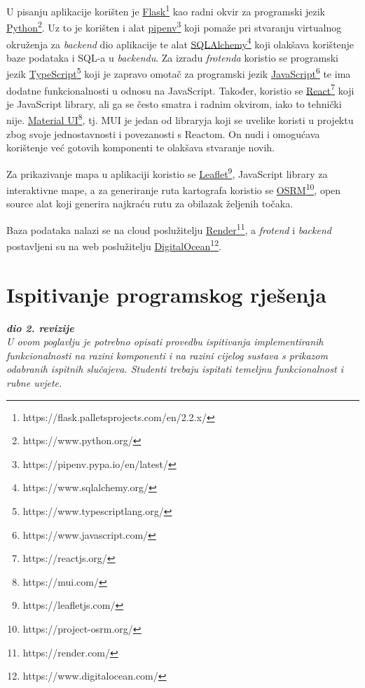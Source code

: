             U pisanju aplikacije korišten je  \underline{Flask}\footnote{https://flask.palletsprojects.com/en/2.2.x/} kao radni okvir za programski jezik \underline{Python}\footnote{https://www.python.org/}. Uz to je korišten i alat \underline{pipenv}\footnote{https://pipenv.pypa.io/en/latest/} koji pomaže pri stvaranju virtualnog okruženja za \textit{backend} dio aplikacije te alat \underline{SQLAlchemy}\footnote{https://www.sqlalchemy.org/} koji olakšava korištenje baze podataka i SQL-a u \textit{backendu}. Za izradu \textit{frotenda} koristio se programski jezik \underline{TypeScript}\footnote{https://www.typescriptlang.org/} koji je zapravo omotač za programski jezik \underline{JavaScript}\footnote{https://www.javascript.com/} te ima dodatne funkcionalnosti u odnosu na JavaScript. Također, koristio se \underline{React}\footnote{https://reactjs.org/} koji je JavaScript library, ali ga se često smatra i radnim okvirom, iako to tehnički nije. \underline{Material UI}\footnote{https://mui.com/}, tj. MUI je jedan od libraryja koji se uvelike koristi u projektu zbog svoje jednostavnosti i povezanosti s Reactom. On nudi i omogućava korištenje već gotovih komponenti te olakšava stvaranje novih. \par
            
            Za prikazivanje mapa u aplikaciji koristio se \underline{Leaflet}\footnote{https://leafletjs.com/}, JavaScript library za interaktivne mape, a za generiranje ruta kartografa koristio se \underline{OSRM}\footnote{https://project-osrm.org/}, open source alat koji generira najkraću rutu za obilazak željenih točaka.
            
            Baza podataka nalazi se na cloud poslužitelju \underline{Render}\footnote{https://render.com/}, a \textit{frotend} i \textit{backend}  postavljeni su na web poslužitelju \underline{DigitalOcean}\footnote{https://www.digitalocean.com/}. \par
			
			
			\eject 
		
	
		\section{Ispitivanje programskog rješenja}
			
			\textbf{\textit{dio 2. revizije}}\\
			
			 \textit{U ovom poglavlju je potrebno opisati provedbu ispitivanja implementiranih funkcionalnosti na razini komponenti i na razini cijelog sustava s prikazom odabranih ispitnih slučajeva. Studenti trebaju ispitati temeljnu funkcionalnost i rubne uvjete.}
	
